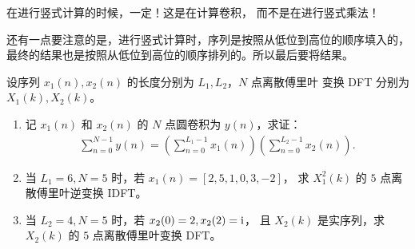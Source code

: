 \begin{note}
    在进行竖式计算的时候，一定！这是在计算卷积，
    而不是在进行竖式乘法！

    还有一点要注意的是，进行竖式计算时，序列是按照从低位到高位的顺序填入的，
    最终的结果也是按照从低位到高位的顺序排列的。所以最后要将结果。
\end{note}

\begin{exercise}
    设序列 $x_1(n), x_2(n)$ 的长度分别为 $L_1, L_2$，$N$ 点离散傅里叶
    变换 DFT 分别为 $X_1(k), X_2(k)$。
    \begin{enumerate}[label=(\arabic*)]
        \item 记 $x_1(n)$ 和 $x_2(n)$ 的 $N$ 点圆卷积为 $y(n)$，求证：
            \begin{align*}
                \sum_{n = 0}^{N - 1}y(n) = \left(\sum_{n = 0}^{L_1 - 1}x_1(n)\right)\left(\sum_{n = 0}^{L_2 - 1}x_2(n)\right).
            \end{align*}
        \item 当 $L_1 = 6, N = 5$ 时，若 $x_1(n) = [2, 5, 1, 0, 3, -2]$，
            求 $X_1^2(k)$ 的 $5$ 点离散傅里叶逆变换 IDFT。
        \item 当 $L_2 = 4, N = 5$ 时，若 $x_2(0) = 2, x_2(2) = \mathrm{i}$，
            且 $X_2(k)$ 是实序列，求 $X_2(k)$ 的 $5$ 点离散傅里叶变换 DFT。
    \end{enumerate}
\end{exercise}

